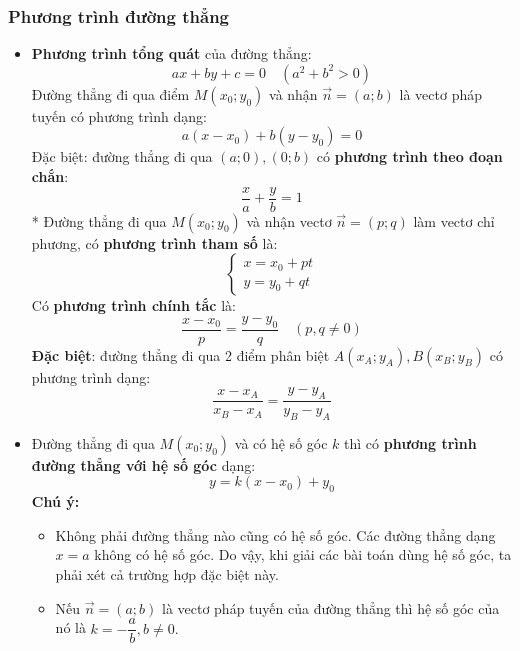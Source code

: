 \subsubsection{Phương trình đường thẳng}
\begin{itemize}
\item \textbf{Phương trình tổng quát} của đường thẳng: 
\begin{equation}
ax + by + c = 0\quad (a^2+b^2>0)
\end{equation}
Đường thẳng đi qua điểm $M(x_0;y_0)$ và nhận $\overrightarrow n = (a; b)$ là vectơ pháp tuyến có phương trình dạng:
\begin{equation}
a(x-x_0) + b(y-y_0) = 0
\end{equation}
Đặc biệt: đường thẳng đi qua $(a; 0), (0; b)$ có \textbf{phương trình theo đoạn chắn}:
\begin{equation}
\dfrac{x}{a}+\dfrac{y}{b}=1
\end{equation}
* Đường thẳng đi qua $M(x_0; y_0)$ và nhận vectơ $\overrightarrow n=(p;q)$ làm vectơ chỉ phương, có \textbf{phương trình tham số} là:
\begin{equation}
\left\{\begin{array}{l} x=x_0+pt\\y=y_0+qt \end{array}\right.
\end{equation}
Có \textbf{phương trình chính tắc} là:
\begin{equation}
\dfrac{x-x_0}{p}=\dfrac{y-y_0}{q} \quad (p,q \neq 0)
\end{equation}
\textbf{Đặc biệt}: đường thẳng đi qua 2 điểm phân biệt $A\left(x_A;y_A\right), B\left(x_B;y_B\right)$ có phương trình dạng:
\begin{equation}
\dfrac{{x - x_A }}{{x_B - x_A }} = \dfrac{{y - y_A }}{{y_B - y_A }}
\end{equation}
\item Đường thẳng đi qua $M(x_0;y_0)$ và có hệ số góc $k$ thì có \textbf{phương trình đường thẳng với hệ số góc} dạng:
\begin{equation}
y=k(x-x_0)+y_0
\end{equation}
\textbf{Chú ý:}
\begin{itemize}
\item Không phải đường thẳng nào cũng có hệ số góc. Các đường thẳng dạng $x=a$ không có hệ số góc. Do vậy, khi giải các bài toán dùng hệ số góc, ta phải xét cả trường hợp đặc biệt này.
\item Nếu $\overrightarrow n = (a; b)$ là vectơ pháp tuyến của đường thẳng thì hệ số góc của nó là $k = -\dfrac{a}{b}, b\neq 0.$
\end{itemize}
\end{itemize}
